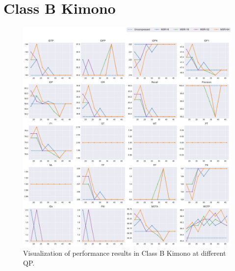 
\section{Class B Kimono}
\label{sec:appendix/Kimono_all}


\begin{figure}[!htbp]
\centering
\includegraphics[width=1.0\linewidth]{img/appendix/Kimono_all_multiplots_qp.pdf}
\caption[Visualization of performance results in Class B Kimono at different QP]
{Visualization of performance results in Class B Kimono at different QP.}
\label{fig:Kimono_all_qp}
\end{figure}

